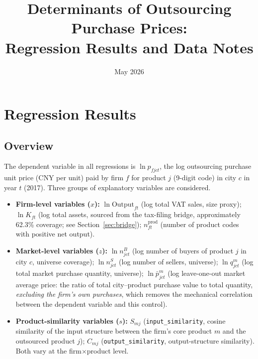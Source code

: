 \documentclass[12pt]{article}
\title{\textbf{Determinants of Outsourcing Purchase Prices:\\
Regression Results and Data Notes}}
\author{}
\date{May 2026}
\begin{document}
\maketitle
\tableofcontents
\clearpage

\section{Regression Results}
\label{sec:regression}

\subsection*{Overview}

The dependent variable in all regressions is
\(\ln p_{fjct}\), the log outsourcing purchase unit price (CNY per unit)
paid by firm \(f\) for product \(j\) (9-digit code) in city \(c\) in year \(t\) (2017).
Three groups of explanatory variables are considered.

\begin{itemize}[leftmargin=1.5em]
  \item \textbf{Firm-level variables (\(x\)):}
    \(\ln\text{Output}_{ft}\) (log total VAT sales, size proxy);
    \(\ln K_{ft}\) (log total assets, sourced from the tax-filing bridge,
    approximately 62.3\% coverage; see Section~\ref{sec:bridge});
    \(n^{\text{prod}}_{ft}\) (number of product codes with positive net output).

  \item \textbf{Market-level variables (\(z\)):}
    \(\ln n^{B}_{jct}\) (log number of buyers of product \(j\) in city \(c\),
    universe coverage);
    \(\ln n^{S}_{jct}\) (log number of sellers, universe);
    \(\ln q^{m}_{jct}\) (log total market purchase quantity, universe);
    \(\ln \bar{p}^{m}_{jct}\) (log leave-one-out market average price: the
    ratio of total city--product purchase value to total quantity,
    \emph{excluding the firm's own purchases}, which removes the mechanical
    correlation between the dependent variable and this control).

  \item \textbf{Product-similarity variables (\(s\)):}
    \(S_{mj}\) (\texttt{input\_similarity}, cosine similarity of the input
    structure between the firm's core product \(m\) and the outsourced product
    \(j\)); \(C_{mj}\) (\texttt{output\_similarity}, output-structure
    similarity). Both vary at the firm\(\times\)product level.
\end{itemize}
\end{document}
